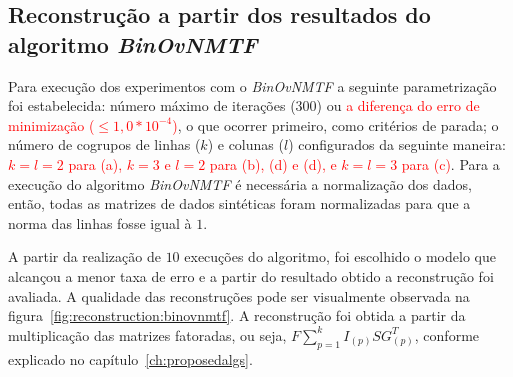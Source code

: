 \documentclass[
    12pt,                %
    oneside,            %
    a4paper,            %
    english,            %
    brazil                %
    ]{abntex2ppgsi}
\begin{document}
\subsection{Reconstrução a partir dos resultados do algoritmo \textit{BinOvNMTF}}
\label{subsec:results-reconstruction-binovnmtf}


Para execução dos experimentos com o \textit{BinOvNMTF} a seguinte parametrização foi estabelecida: número máximo de iterações ($300$) ou \textcolor{red}{a diferença do erro de minimização ($\leq 1,0 * 10^{-4}$)}, o que ocorrer primeiro, como critérios de parada; o número de cogrupos de linhas ($k$) e colunas ($l$) configurados da seguinte maneira: \textcolor{red}{$k = l = 2$ para (a), $k = 3$ e $l = 2 $ para (b), (d) e (d), e $k = l = 3$ para (c)}. Para a execução do algoritmo \textit{BinOvNMTF} é necessária a normalização dos dados, então, todas as matrizes de dados sintéticas foram normalizadas para que a norma das linhas fosse igual à $1$.

A partir da realização de $10$ execuções do algoritmo, foi escolhido o modelo que alcançou a menor taxa de erro e a partir do resultado obtido a reconstrução foi avaliada. A qualidade das reconstruções pode ser visualmente observada na figura~\ref{fig:reconstruction:binovnmtf}. A reconstrução foi obtida a partir da multiplicação das matrizes fatoradas, ou seja, $F \sum_{p=1}^{k} I_{(p)} S G_{(p)}^T$, conforme explicado no capítulo~\ref{ch:proposedalgs}.

\end{document}
